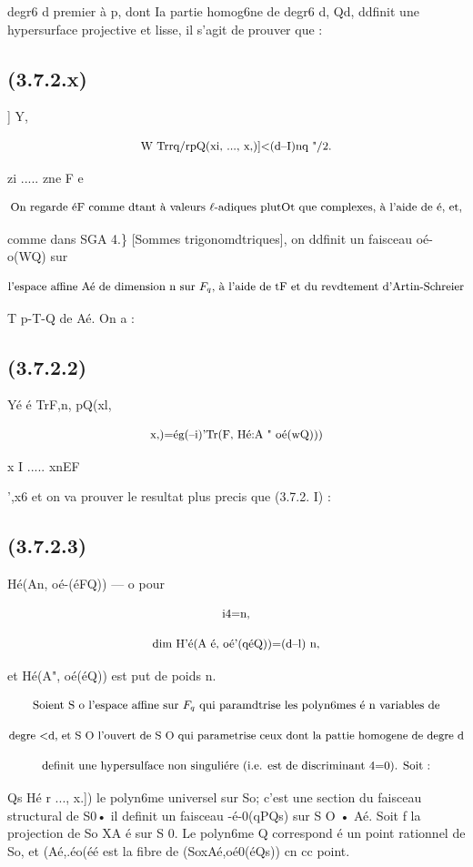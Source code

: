 \documentclass[11pt]{article}
\theoremstyle{remark}
\begin{document}
degr6 d premier à p, dont Ia partie homog6ne de degr6 d, Qd, ddfinit une hypersurface projective et lisse, il s'agit de prouver que :

\subsection*{(3.7.2.x)}

] Y,

\[\text{\small W Trrq/rpQ(xi, ..., x,)]<(d--I)nq "/2.}\]

zi ..... zne F e

\[\text{\small On regarde éF comme dtant à valeurs \(\ell\)-adiques plutOt que complexes, à l'aide de é, et,}\]

comme dans SGA 4.\} [Sommes trigonomdtriques], on ddfinit un faisceau oé-o(WQ) sur

\[\text{\small l'espace affine Aé de dimension n sur \(F_q\), à l'aide de tF et du revdtement d'Artin-Schreier}\]

T p-T-Q de Aé. On a :

\subsection*{(3.7.2.2)}

Yé é TrF,n, pQ(xl,

\[\text{\small x,)=ég(--i)'Tr(F, Hé:A " oé(wQ)))}\]

x I ..... xnEF

',x6 et on va prouver le resultat plus precis que (3.7.2. I) :

\subsection*{(3.7.2.3)}

Hé(An, oé-(éFQ)) --- o pour

\[\text{\small i4=n,}\]

\[\text{\small dim H'é(A é, oé'(qéQ))=(d--l) n,}\]

et Hé(A", oé(éQ)) est put de poids n.

\[\text{\small Soient S o l'espace affine sur \(F_q\) qui paramdtrise les polyn6mes é n variables de}\]

\[\text{\small degre <d, et S O l'ouvert de S O qui parametrise ceux dont la pattie homogene de degre d}\]

\[\text{\small definit une hypersulface non singuliére (i.e. est de discriminant 4=0). Soit :}\]

Qs Hé r ..., x.]) le polyn6me universel sur So; c'est une section du faisceau structural de S0• il definit un faisceau -é-0(qPQs) sur S O • Aé. Soit f la projection de So XA é sur S 0. Le polyn6me Q correspond é un point rationnel de So, et (Aé,.éo(éé est la fibre de (SoxAé,oé0(éQs)) cn cc point.
\end{document}
